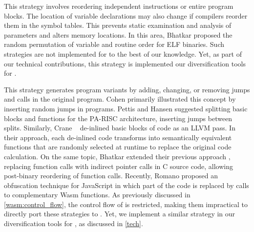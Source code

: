 This strategy involves reordering independent instructions or entire program blocks.
The location of variable declarations may also change if compilers reorder them in the symbol tables. This prevents static examination and analysis of parameters and alters memory locations. In this area, Bhatkar \etal \cite{bhatkar03, bhatkar2005efficient} proposed the random permutation of variable and routine order for ELF binaries.
Such strategies are not implemented for \Wasm to the best of our knowledge.
Yet, as part of our technical contributions, this strategy is implemented our diversification tools for \Wasm.

This strategy generates program variants by adding, changing, or removing jumps and calls in the original program. Cohen \cite{cohen1993operating} primarily illustrated this concept by inserting random jumps in programs. Pettis and Hansen \cite{pettisochhansen} suggested splitting basic blocks and functions for the PA-RISC architecture, inserting jumps between splits.
Similarly, Crane \etal~\cite{crane2015thwarting} de-inlined basic blocks of code as an LLVM pass. 
In their approach, each de-inlined code transforms into semantically equivalent functions that are randomly selected at runtime to replace the original code calculation. 
On the same topic, Bhatkar \etal \cite{bhatkar2005efficient} extended their previous approach \cite{bhatkar03}, replacing function calls with indirect pointer calls in C source code, allowing post-binary reordering of function calls. 
Recently, Romano \etal \cite{wobfuscator} proposed an obfuscation technique for JavaScript in which part of the code is replaced by calls to complementary Wasm functions.
As previously discussed in \autoref{wasm:control_flow}, the control flow of \Wasm is restricted, making them impractical to directly port these strategies to \Wasm.
Yet, we implement a similar strategy in our diversification tools for \Wasm, as discussed in \autoref{tech}.

